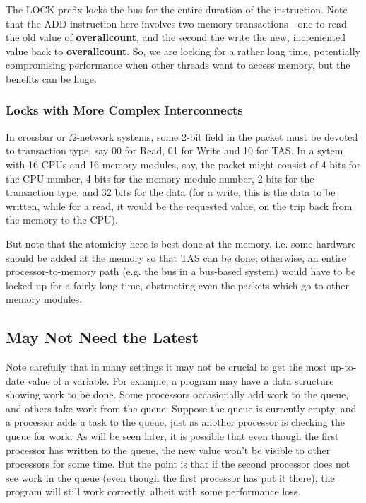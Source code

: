 The LOCK prefix locks the bus for the entire duration of the
instruction.  Note that the ADD instruction here involves two memory
transactions---one to read the old value of {\bf overallcount}, and the
second the write the new, incremented value back to {\bf overallcount}.
So, we are locking for a rather long time, potentially compromising
performance when other threads want to access memory, but the benefits
can be huge.

\subsubsection{Locks with More Complex Interconnects}

In crossbar or $\Omega$-network systems, some 2-bit field in the packet
must be devoted to transaction type, say 00 for Read, 01 for Write and
10 for TAS.  In a sytem with 16 CPUs and 16 memory modules, say, the
packet might consist of 4 bits for the CPU number, 4 bits for the memory
module number, 2 bits for the transaction type, and 32 bits for the data
(for a write, this is the data to be written, while for a read, it would
be the requested value, on the trip back from the memory to the CPU).

But note that the atomicity here is best done at the memory, i.e. some
hardware should be added at the memory so that TAS can be done;
otherwise, an entire processor-to-memory path (e.g. the bus in a
bus-based system) would have to be locked up for a fairly long time,
obstructing even the packets which go to other memory modules.

\subsection{May Not Need the Latest}

Note carefully that in many settings it may not be crucial to get the
most up-to-date value of a variable.  For example, a program may have a
data structure showing work to be done.  Some processors occasionally
add work to the queue, and others take work from the queue.  Suppose the
queue is currently empty, and a processor adds a task to the queue, just
as another processor is checking the queue for work.  As will be seen
later, it is possible that even though the first processor has written
to the queue, the new value won't be visible to other processors for
some time.  But the point is that if the second processor does not see
work in the queue (even though the first processor has put it there),
the program will still work correctly, albeit with some performance
loss.

